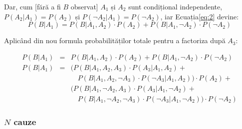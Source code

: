 \documentclass[12pt]{article}
\begin{document}
Dar, cum [fără a fi $B$ observat] $A_1$ și $A_2$ sunt condițional
independente, $P(A_2 \vert A_1) = P(A_2)$ și $P(\neg A_2 \vert A_1) =
P(\neg A_2)$, iar Ecuația\ref{eq:2} devine:
\begin{equation}
  \label{eq:3}
  P(B \vert A_1) = P(B \vert A_1, A_2) \cdot P(A_2) + P(B \vert A_1, \neg A_2) \cdot P(\neg A_2)
\end{equation}

Aplicând din nou formula probabilităților totale pentru a factoriza după $A_3$:

\begin{eqnarray*}
  \label{eq:4}
  P(B \vert A_1) & = & P(B \vert A_1, A_2) \cdot P(A_2) + P(B \vert A_1, \neg A_2) \cdot P(\neg A_2) \\
  P(B \vert A_1) & = & \big( P(B \vert A_1, A_2, A_3) \cdot P(A_3 \vert A_1, A_2) + \\
  & & 
  \quad P(B \vert A_1, A_2, \neg A_3) \cdot P(\neg A_3 \vert A_1, A_2) \big) \cdot P(A_2) + \\
  &  & \big( P(B \vert A_1, \neg A_2, A_3) \cdot P(A_3 \vert A_1, \neg A_2) + \\
  & & \quad P(B \vert A_1, \neg A_2, \neg A_3) \cdot P(\neg A_3 \vert A_1, \neg A_2) \big) \cdot P(\neg A_2)
\end{eqnarray*}

\subsubsection*{$N$ cauze}
\label{sec:n}
\end{document}
